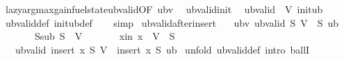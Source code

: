 \begin{isabellebody}
\ lazy{\isacharunderscore}{\kern0pt}argmax{\isacharunderscore}{\kern0pt}gain{\isacharunderscore}{\kern0pt}fuel{\isacharunderscore}{\kern0pt}state{\isacharunderscore}{\kern0pt}ub{\isacharunderscore}{\kern0pt}valid{\isacharbrackleft}{\kern0pt}OF\ ubv{\isacharbrackright}{\kern0pt}\ \isakeywordONE{{\isachardot}{\kern0pt}}\isamarkupfalse%
%
\endisatagproof
{\isafoldproof}%
%
\isadelimproof
%
\endisadelimproof
%
\isadelimdocument
%
\endisadelimdocument
%
\isatagdocument
%
\isamarkuptrue%
%
\endisatagdocument
{\isafolddocument}%
%
\isadelimdocument
%
\endisadelimdocument
{}\isamarkupfalse%
\ ub{\isacharunderscore}{\kern0pt}valid{\isacharunderscore}{\kern0pt}init{\isacharcolon}{\kern0pt}\isanewline
\ \ {\isachardoublequoteopen}ub{\isacharunderscore}{\kern0pt}valid\ {\isacharbraceleft}{\kern0pt}{\isacharbraceright}{\kern0pt}\ V\ init{\isacharunderscore}{\kern0pt}ub{\isachardoublequoteclose}\isanewline
%
\isadelimproof
\ \ %
\endisadelimproof
%
\isatagproof
{}\isamarkupfalse%
\ ub{\isacharunderscore}{\kern0pt}valid{\isacharunderscore}{\kern0pt}def\ init{\isacharunderscore}{\kern0pt}ub{\isacharunderscore}{\kern0pt}def\isanewline
\ \ \isamarkupfalse%
\ simp%
\endisatagproof
{\isafoldproof}%
%
\isadelimproof
\isanewline
%
\endisadelimproof
\isanewline
{}\isamarkupfalse%
\ ub{\isacharunderscore}{\kern0pt}valid{\isacharunderscore}{\kern0pt}after{\isacharunderscore}{\kern0pt}insert{\isacharcolon}{\kern0pt}\isanewline
\ \ \ ubv{\isacharcolon}{\kern0pt}\ {\isachardoublequoteopen}ub{\isacharunderscore}{\kern0pt}valid\ S\ {\isacharparenleft}{\kern0pt}V\ {\isacharminus}{\kern0pt}\ S{\isacharparenright}{\kern0pt}\ ub{\isachardoublequoteclose}\isanewline
\ \ \ \ \ \ \ Ssub{\isacharcolon}{\kern0pt}\ {\isachardoublequoteopen}S\ {\isasymsubseteq}\ V{\isachardoublequoteclose}\isanewline
\ \ \ \ \ \ \ x{\isacharunderscore}{\kern0pt}in{\isacharcolon}{\kern0pt}\ {\isachardoublequoteopen}x\ {\isasymin}\ V\ {\isacharminus}{\kern0pt}\ S{\isachardoublequoteclose}\isanewline
\ \ \ {\isachardoublequoteopen}ub{\isacharunderscore}{\kern0pt}valid\ {\isacharparenleft}{\kern0pt}insert\ x\ S{\isacharparenright}{\kern0pt}\ {\isacharparenleft}{\kern0pt}V\ {\isacharminus}{\kern0pt}\ insert\ x\ S{\isacharparenright}{\kern0pt}\ ub{\isachardoublequoteclose}\isanewline
%
\isadelimproof
%
\endisadelimproof
%
\isatagproof
{}\isamarkupfalse%
\ {\isacharparenleft}{\kern0pt}unfold\ ub{\isacharunderscore}{\kern0pt}valid{\isacharunderscore}{\kern0pt}def{\isacharcomma}{\kern0pt}\ intro\ ballI{\isacharparenright}{\kern0pt}\isanewline

\end{isabellebody}
